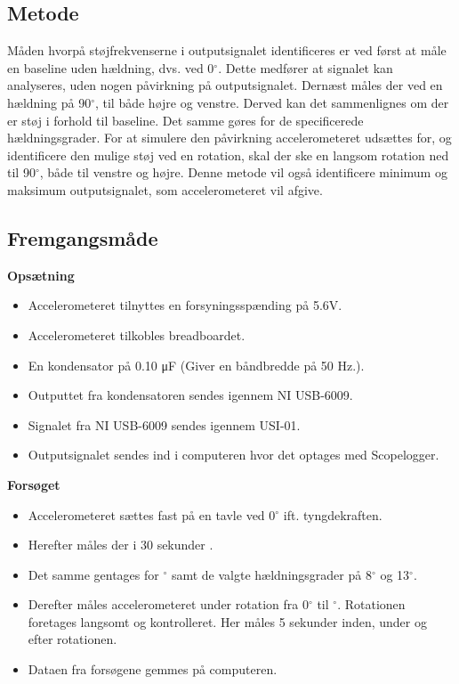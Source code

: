 \subsection{Metode}
Måden hvorpå støjfrekvenserne i outputsignalet identificeres er ved først at måle en baseline uden hældning, dvs. ved 0$^{\circ}$. Dette medfører at signalet kan analyseres, uden nogen påvirkning på outputsignalet. Dernæst måles der ved en hældning på 90$^{\circ}$, til både højre og venstre. Derved kan det sammenlignes om der er støj i forhold til baseline. Det samme gøres for de specificerede hældningsgrader. For at simulere den påvirkning accelerometeret udsættes for, og identificere den mulige støj ved en rotation, skal der ske en langsom rotation ned til 90$^{\circ}$, både til venstre og højre. Denne metode vil også identificere minimum og maksimum outputsignalet, som accelerometeret vil afgive.

\subsection{Fremgangsmåde}
\textbf{Opsætning}
\begin{itemize}
\item Accelerometeret tilnyttes en forsyningsspænding på 5.6V.
\item Accelerometeret tilkobles breadboardet.
\item En kondensator på 0.10 μF (Giver en båndbredde på 50 Hz.).
\item Outputtet fra kondensatoren sendes igennem NI USB-6009.
\item Signalet fra NI USB-6009 sendes igennem USI-01.
\item Outputsignalet sendes ind i computeren hvor det optages med Scopelogger.
\end{itemize}

\textbf{Forsøget}
\begin{itemize}
\item Accelerometeret sættes fast på en tavle ved 0$^{\circ}$ ift. tyngdekraften. 
\item Herefter måles der i 30 sekunder .
\item Det samme gentages for $^{\circ}$ samt de valgte hældningsgrader på 8$^{\circ}$ og 13$^{\circ}$.
\item Derefter måles accelerometeret under rotation fra 0$^{\circ}$ til $^{\circ}$. Rotationen foretages langsomt og kontrolleret. Her måles 5 sekunder inden, under og efter rotationen.
\item Dataen fra forsøgene gemmes på computeren.
\end{itemize}









